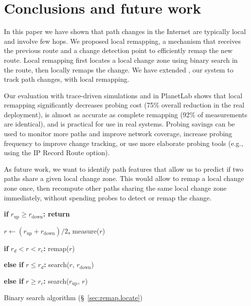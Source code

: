 \section{Conclusions and future work}
\label{sec:conc}

In this paper we have shown that path changes in the Internet are
typically local and involve few hops.  We proposed local remapping, a
mechanism that receives the previous route and a change detection point
to efficiently remap the new route.  Local remapping first locates a
local change zone using binary search in the route, then locally remaps
the change.  We have extended \dtrack{}, our system to track path
changes, with local remapping.

Our evaluation with trace-driven simulations and in PlanetLab shows that
local remapping significantly decreases probing cost (75\% overall
reduction in the real deployment), is almost as accurate as complete
remapping (92\% of measurements are identical), and is practical for use
in real systems.  Probing savings can be used to monitor more paths and
improve network coverage, increase probing frequency to improve change
tracking, or use more elaborate probing tools (e.g., using the IP Record
Route option).

As future work, we want to identify path features that allow us to
predict if two paths share a given local change zone.  This would allow
\dtrack{} to remap a local change zone once, then recompute other paths
sharing the same local change zone immediately, without spending probes
to detect or remap the change.

\begin{algorithm}[h]


\textbf{if} $r_\mathrm{up} \ge r_\mathrm{down}$\textbf{: return}

$r \leftarrow (r_\mathrm{up} + r_\mathrm{down})/2$\textbf{,} measure($r$)

\textbf{if} $r_d < r < r_c$\textbf{:} remap($r$)

\textbf{else if} $r \le r_d$\textbf{:} search($r$, $r_\textrm{down}$)

\textbf{else if} $r \ge r_c$\textbf{:} search($r_\mathrm{up}$, $r$)

\caption{Binary search algorithm (\S~\ref{sec:remap.locate})}
\end{algorithm}


